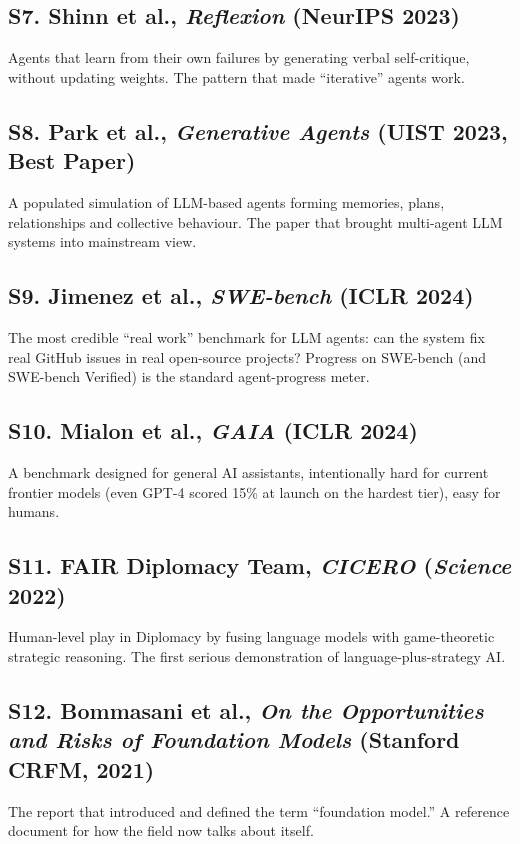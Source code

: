 \documentclass[11pt,a4paper]{article}
\begin{document}
\subsection*{S7. Shinn et al., \emph{Reflexion} (NeurIPS 2023)}
Agents that learn from their own failures by generating verbal
self-critique, without updating weights. The pattern that made
``iterative'' agents work.

\subsection*{S8. Park et al., \emph{Generative Agents} (UIST 2023, Best Paper)}
A populated simulation of LLM-based agents forming memories, plans,
relationships and collective behaviour. The paper that brought
multi-agent LLM systems into mainstream view.

\subsection*{S9. Jimenez et al., \emph{SWE-bench} (ICLR 2024)}
The most credible ``real work'' benchmark for LLM agents: can the
system fix real GitHub issues in real open-source projects? Progress
on SWE-bench (and SWE-bench Verified) is the standard agent-progress
meter.

\subsection*{S10. Mialon et al., \emph{GAIA} (ICLR 2024)}
A benchmark designed for general AI assistants, intentionally hard for
current frontier models (even GPT-4 scored 15\% at launch on the
hardest tier), easy for humans.

\subsection*{S11. FAIR Diplomacy Team, \emph{CICERO} (\emph{Science} 2022)}
Human-level play in Diplomacy by fusing language models with
game-theoretic strategic reasoning. The first serious demonstration of
language-plus-strategy AI.

\subsection*{S12. Bommasani et al., \emph{On the Opportunities and Risks of
Foundation Models} (Stanford CRFM, 2021)}
The report that introduced and defined the term ``foundation model.''
A reference document for how the field now talks about itself.
\end{document}
